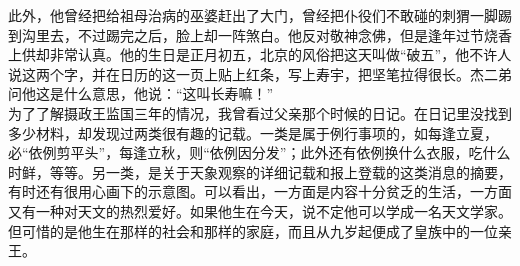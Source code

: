 此外，他曾经把给祖母治病的巫婆赶出了大门，曾经把仆役们不敢碰的刺猬一脚踢到沟里去，不过踢完之后，脸上却一阵煞白。他反对敬神念佛，但是逢年过节烧香上供却非常认真。他的生日是正月初五，北京的风俗把这天叫做“破五”，他不许人说这两个字，并在日历的这一页上贴上红条，写上寿宇，把坚笔拉得很长。杰二弟问他这是什么意思，他说：“这叫长寿嘛！”\\

为了了解摄政王监国三年的情况，我曾看过父亲那个时候的日记。在日记里没找到多少材料，却发现过两类很有趣的记载。一类是属于例行事项的，如每逢立夏，必“依例剪平头”，每逢立秋，则“依例因分发”；此外还有依例换什么衣服，吃什么时鲜，等等。另一类，是关于天象观察的详细记载和报上登载的这类消息的摘要，有时还有很用心画下的示意图。可以看出，一方面是内容十分贫乏的生活，一方面又有一种对天文的热烈爱好。如果他生在今天，说不定他可以学成一名天文学家。但可惜的是他生在那样的社会和那样的家庭，而且从九岁起便成了皇族中的一位亲王。